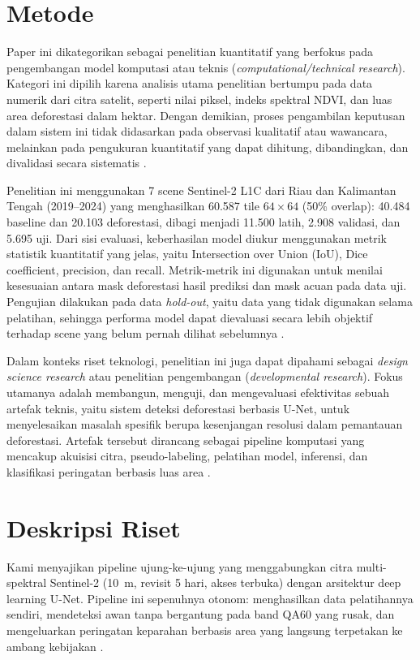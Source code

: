 \documentclass[10pt,a4paper,onecolumn]{article}
\begin{document}
\section{Metode}
Paper ini dikategorikan sebagai penelitian kuantitatif yang berfokus pada
pengembangan model komputasi atau teknis
(\textit{computational/technical research}). Kategori ini dipilih karena
analisis utama penelitian bertumpu pada data numerik dari citra satelit,
seperti nilai piksel, indeks spektral NDVI, dan luas area deforestasi
dalam hektar. Dengan demikian, proses pengambilan keputusan dalam sistem
ini tidak didasarkan pada observasi kualitatif atau wawancara, melainkan
pada pengukuran kuantitatif yang dapat dihitung, dibandingkan, dan
divalidasi secara sistematis \cite{tucker1979red,congalton1991accuracy}.

Penelitian ini menggunakan 7 scene Sentinel-2 L1C dari Riau dan Kalimantan Tengah (2019--2024) yang menghasilkan 60.587 tile $64\times64$ (50\% overlap): 40.484 baseline dan 20.103 deforestasi, dibagi menjadi 11.500 latih, 2.908 validasi, dan 5.695 uji.
Dari sisi evaluasi, keberhasilan model diukur menggunakan metrik
statistik kuantitatif yang jelas, yaitu Intersection over Union (IoU),
Dice coefficient, precision, dan recall. Metrik-metrik ini digunakan
untuk menilai kesesuaian antara mask deforestasi hasil prediksi dan mask
acuan pada data uji. Pengujian dilakukan pada data \textit{hold-out},
yaitu data yang tidak digunakan selama pelatihan, sehingga performa
model dapat dievaluasi secara lebih objektif terhadap scene yang belum
pernah dilihat sebelumnya \cite{powers2011evaluation,milletari2016vnet}.

Dalam konteks riset teknologi, penelitian ini juga dapat dipahami
sebagai \textit{design science research} atau penelitian pengembangan
(\textit{developmental research}). Fokus utamanya adalah membangun,
menguji, dan mengevaluasi efektivitas sebuah artefak teknis, yaitu
sistem deteksi deforestasi berbasis U-Net, untuk menyelesaikan masalah
spesifik berupa kesenjangan resolusi dalam pemantauan deforestasi.
Artefak tersebut dirancang sebagai pipeline komputasi yang mencakup
akuisisi citra, pseudo-labeling, pelatihan model, inferensi, dan
klasifikasi peringatan berbasis luas area \cite{ronneberger2015unet,gorelick2017gee}.

\section{Deskripsi Riset}
Kami menyajikan pipeline ujung-ke-ujung yang menggabungkan citra
multi-spektral Sentinel-2 (10~m, revisit 5 hari, akses terbuka)
dengan arsitektur deep learning U-Net. Pipeline ini sepenuhnya otonom:
menghasilkan data pelatihannya sendiri, mendeteksi awan tanpa
bergantung pada band QA60 yang rusak, dan mengeluarkan peringatan
keparahan berbasis area yang langsung terpetakan ke ambang kebijakan \cite{drusch2012sentinel2}.
\end{document}
